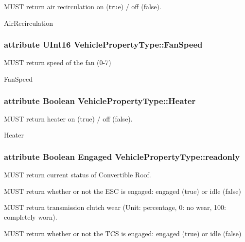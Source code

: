 M\+U\+S\+T return air recirculation on (true) / off (false). 

Air\+Recirculation \hypertarget{interfaceVehiclePropertyType_a03dc26f81191b1021260741f6c1bbd2b}{
\subsubsection[{Fan\+Speed}]{\setlength{\rightskip}{0pt plus 5cm}attribute U\+Int16 Vehicle\+Property\+Type\+::\+Fan\+Speed}}\label{interfaceVehiclePropertyType_a03dc26f81191b1021260741f6c1bbd2b}


M\+U\+S\+T return speed of the fan (0-\/7) 

Fan\+Speed \hypertarget{interfaceVehiclePropertyType_a9a5cea3b176457e74c05822ec0dd1644}{
\subsubsection[{Heater}]{\setlength{\rightskip}{0pt plus 5cm}attribute Boolean Vehicle\+Property\+Type\+::\+Heater}}\label{interfaceVehiclePropertyType_a9a5cea3b176457e74c05822ec0dd1644}


M\+U\+S\+T return heater on (true) / off (false). 

Heater \hypertarget{interfaceVehiclePropertyType_a80c4d8f18eee83fc77fded4ac07c687b}{
\subsubsection[{readonly}]{\setlength{\rightskip}{0pt plus 5cm}attribute Boolean Engaged Vehicle\+Property\+Type\+::readonly}}\label{interfaceVehiclePropertyType_a80c4d8f18eee83fc77fded4ac07c687b}


M\+U\+S\+T return current status of Convertible Roof. 

M\+U\+S\+T return whether or not the E\+S\+C is engaged\+: engaged (true) or idle (false)

M\+U\+S\+T return transmission clutch wear (Unit\+: percentage, 0\+: no wear, 100\+: completely worn).

M\+U\+S\+T return whether or not the T\+C\+S is engaged\+: engaged (true) or idle (false)

